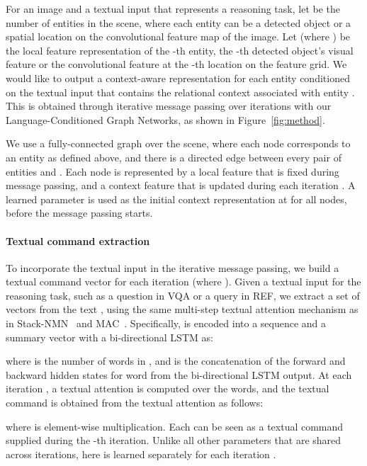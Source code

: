 \documentclass[10pt,twocolumn,letterpaper]{article}
\begin{document}
For an image  and a textual input  that represents a reasoning task, let  be the number of entities in the scene, where each entity can be a detected object or a spatial location on the convolutional feature map of the image. Let  (where ) be the local feature representation of the -th entity, \ie the -th detected object's visual feature or the convolutional feature at the -th location on the feature grid. We would like to output a context-aware representation  
for each entity  conditioned on the textual input  that contains the relational context associated with entity . This is obtained through iterative message passing over  iterations with our Language-Conditioned Graph Networks, as shown in Figure~\ref{fig:method}.

We use a fully-connected graph over the scene, where each node corresponds to an entity  as defined above, and there is a directed edge  between every pair of entities  and . 
Each node  is represented by a local feature  that is fixed during message passing, and a context feature  that is updated during each iteration . A learned parameter is used as the initial context representation  at  for all nodes, before the message passing starts.

\vspace{-1em}
\paragraph{Textual command extraction} To incorporate the textual input in the iterative message passing, we build a textual command vector for each iteration  (where ). Given a textual input  for the reasoning task, such as a question in VQA or a query in REF, we extract a set of vectors  from the text , using the same multi-step textual attention mechanism as in Stack-NMN~\cite{hu2018explainable} and MAC~\cite{hudson2018compositional}. Specifically,  is encoded into a sequence  and a summary vector  with a bi-directional LSTM as: 

where  is the number of words in , and  is the concatenation of the forward and backward hidden states for word  from the bi-directional LSTM output. At each iteration , a textual attention  is computed over the words, and the textual command  is obtained from the textual attention as follows:

where  is element-wise multiplication. Each  can be seen as a textual command supplied during the -th iteration. Unlike all other parameters that are shared across iterations, here  is learned separately for each iteration . 
\end{document}

